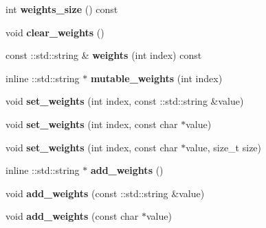 \begin{DoxyCompactItemize}
int {\bfseries weights\+\_\+size} () const
\item 
\mbox{\label{classcaffe_1_1_solver_parameter_aa00608415af9dbfc7ee1c2916a7ac849}} 
void {\bfseries clear\+\_\+weights} ()
\item 
\mbox{\label{classcaffe_1_1_solver_parameter_a0f437e13d60dd80955ac87953555cb74}} 
const \+::std\+::string \& {\bfseries weights} (int index) const
\item 
\mbox{\label{classcaffe_1_1_solver_parameter_a68d536458fe63ee76d1bf531e4f37e89}} 
inline \+::std\+::string $\ast$ {\bfseries mutable\+\_\+weights} (int index)
\item 
\mbox{\label{classcaffe_1_1_solver_parameter_a9c46cd37ade6df42d66207f87d738343}} 
void {\bfseries set\+\_\+weights} (int index, const \+::std\+::string \&value)
\item 
\mbox{\label{classcaffe_1_1_solver_parameter_aad3af83eb734268df982dc53838647e6}} 
void {\bfseries set\+\_\+weights} (int index, const char $\ast$value)
\item 
\mbox{\label{classcaffe_1_1_solver_parameter_a6fd6f9c4dee406d2af3f1b251eb05a0a}} 
void {\bfseries set\+\_\+weights} (int index, const char $\ast$value, size\+\_\+t size)
\item 
\mbox{\label{classcaffe_1_1_solver_parameter_ac5183db863d18c3d9c811a3ebf220d8a}} 
inline \+::std\+::string $\ast$ {\bfseries add\+\_\+weights} ()
\item 
\mbox{\label{classcaffe_1_1_solver_parameter_aa2513f70901162c985ba68aa94e58345}} 
void {\bfseries add\+\_\+weights} (const \+::std\+::string \&value)
\item 
\mbox{\label{classcaffe_1_1_solver_parameter_ac480a74a7b5b476da80b015efdfbe741}} 
void {\bfseries add\+\_\+weights} (const char $\ast$value)
\item 
\mbox{\label{classcaffe_1_1_solver_parameter_a8f504d3bf2b1092b44ffa515c2fdf332}} 

\end{DoxyCompactItemize}
